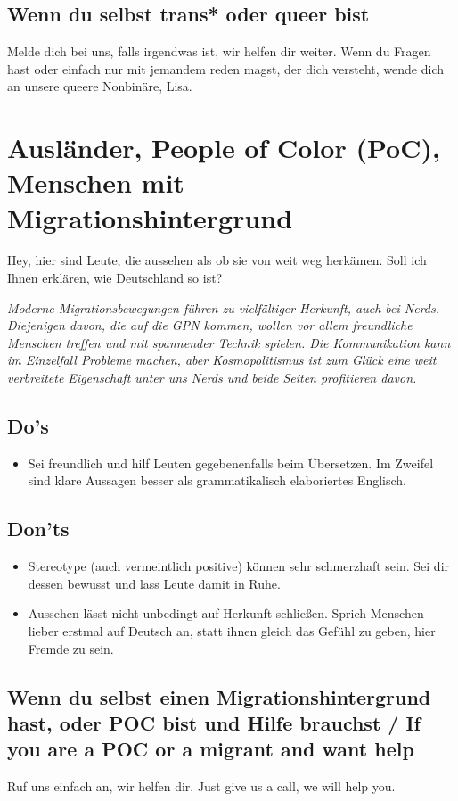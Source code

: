 \documentclass[10pt]{leaflet}
\begin{document}
\subsection{Wenn du selbst trans* oder queer bist}
Melde dich bei uns, falls irgendwas ist, wir helfen dir weiter. Wenn
du Fragen hast oder einfach nur mit jemandem reden magst, der dich
versteht, wende dich an unsere queere Nonbinäre, Lisa.
\clearpage



\section{Ausländer,  People of Color (PoC), Menschen mit
  Migrationshintergrund}
\label{sec-4}
 Hey, hier sind Leute, die aussehen als ob sie von weit weg
herkämen. Soll ich Ihnen erklären, wie Deutschland so ist?

\emph{Moderne Migrationsbewegungen führen zu vielfältiger Herkunft,
  auch bei Nerds. Diejenigen davon, die auf die GPN kommen, wollen vor
  allem freundliche Menschen treffen und mit spannender Technik
  spielen. Die Kommunikation kann im Einzelfall Probleme machen, aber
  Kosmopolitismus ist zum Glück eine weit verbreitete Eigenschaft
  unter uns Nerds und beide Seiten profitieren davon.}

\subsection{Do's}
\label{sec-4-1}
\begin{itemize}
\item Sei freundlich und hilf Leuten gegebenenfalls beim
  Übersetzen. Im Zweifel sind klare Aussagen besser als
  grammatikalisch elaboriertes Englisch.
\end{itemize}
\subsection{Don'ts}
\label{sec-4-2}
\begin{itemize}
\item Stereotype (auch vermeintlich positive) können sehr schmerzhaft
  sein. Sei dir dessen bewusst und lass Leute damit in Ruhe.
\item Aussehen lässt nicht unbedingt auf Herkunft schließen. Sprich
  Menschen lieber erstmal auf Deutsch an, statt ihnen gleich das
  Gefühl zu geben, hier Fremde zu sein.
\end{itemize}
\subsection{Wenn du selbst einen Migrationshintergrund hast, oder POC bist  und  Hilfe brauchst / If you are a POC or a migrant and want help}
Ruf uns einfach an, wir helfen dir. Just give us a call, we will help
you.
\end{document}
